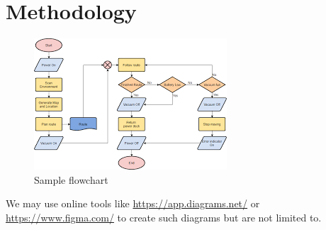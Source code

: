 \section{Methodology}


\begin{figure}[H]
    \centering
    \includegraphics[width=0.5\linewidth]{Images/flow.png}
    \caption{Sample flowchart}
    \label{fig:enter-label}
\end{figure}

We may use online tools like \url{https://app.diagrams.net/} or \url{https://www.figma.com/} to create such diagrams but are not limited to.

